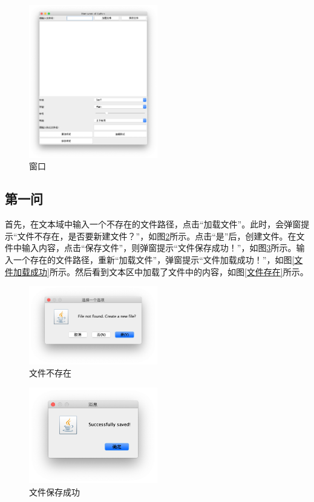 \documentclass[11pt]{homework}
\begin{document}
  \begin{figure}
    \centering
    \includegraphics[width=0.5\textwidth]{窗口}
    \caption{窗口}
    \label{窗口}
  \end{figure}

  \subsection*{第一问}

  首先，在文本域中输入一个不存在的文件路径，点击“加载文件”。此时，会弹窗提示“文件不存在，是否要新建文件？”，如图\ref{文件不存在}所示。点击“是”后，创建文件。在文件中输入内容，点击“保存文件”，则弹窗提示“文件保存成功！”，如图\ref{文件保存成功}所示。输入一个存在的文件路径，重新“加载文件”，弹窗提示“文件加载成功！”，如图\ref{文件加载成功}所示。然后看到文本区中加载了文件中的内容，如图\ref{文件存在}所示。

  \begin{figure}
    \centering
    \includegraphics[width=0.5\textwidth]{文件不存在}
    \caption{文件不存在}
    \label{文件不存在}
  \end{figure}

  \begin{figure}
    \centering
    \includegraphics[width=0.5\textwidth]{文件保存成功}
    \caption{文件保存成功}
    \label{文件保存成功}
  \end{figure}
\end{document}
